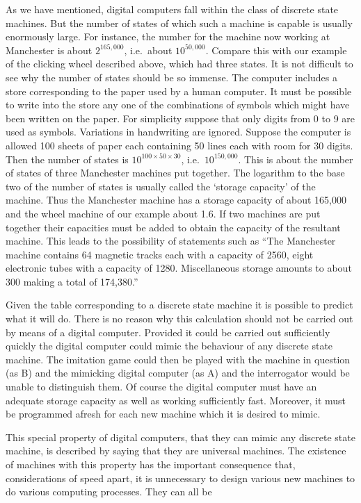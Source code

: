 \documentclass[10pt]{article} %
\begin{document}
As we have mentioned, digital computers fall within the class of discrete state machines. But the number of states of which such a machine is capable is usually enormously large. For instance, the number for the machine now working at Manchester is about $2^{165,000}$, i.e.~about $10^{50,000}$. Compare this with our example of the clicking wheel described above, which had three states. It is not difficult to see why the number of states should be so immense. The computer includes a store corresponding to the paper used by a human computer. It must be possible to write into the store any one of the combinations of symbols which might have been written on the paper. For simplicity suppose that only digits from 0 to 9 are used as symbols. Variations in handwriting are ignored. Suppose the computer is allowed 100 sheets of paper each containing 50 lines each with room for 30 digits. Then the number of states is $10^{100 \times 50 \times 30}$, i.e.~$10^{150,000}$. This is about the number of states of three Manchester machines put together. The logarithm to the base two of the number of states is usually called the `storage capacity' of the machine. Thus the Manchester machine has a storage capacity of about 165,000 and the wheel machine of our example about 1.6. If two machines are put together their capacities must be added to obtain the capacity of the resultant machine. This leads to the possibility of statements such as ``The Manchester machine contains 64 magnetic tracks each with a capacity of 2560, eight electronic tubes with a capacity of 1280. Miscellaneous storage amounts to about 300 making a total of 174,380.''\par

Given the table corresponding to a discrete state machine it is possible to predict what it will do. There is no reason why this calculation should not be carried out by means of a digital computer. Provided it could be carried out sufficiently quickly the digital computer could mimic the behaviour of any discrete state machine. The imitation game could then be played with the machine in question (as B) and the mimicking digital computer (as A) and the interrogator would be unable to distinguish them. Of course the digital computer must have an adequate storage capacity as well as working sufficiently fast. Moreover, it must be programmed afresh for each new machine which it is desired to mimic.

This special property of digital computers, that they can mimic any discrete state machine, is described by saying that they are universal machines. The existence of machines with this property has the important consequence that, considerations of speed apart, it is unnecessary to design various new machines to do various computing processes. They can all be
\end{document}
